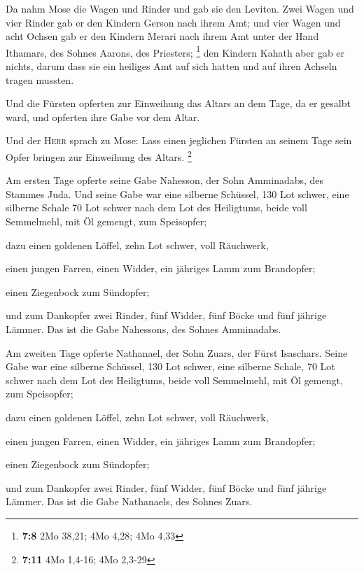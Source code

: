  Da nahm Mose die Wagen und Rinder und gab sie den
Leviten.  Zwei Wagen und vier Rinder gab er den Kindern
Gerson nach ihrem Amt;  und vier Wagen und acht Ochsen gab
er den Kindern Merari nach ihrem Amt unter der Hand Ithamars, des Sohnes
Aarons, des Priesters; \footnote{\textbf{7:8} 2Mo 38,21; 4Mo 4,28; 4Mo
  4,33}  den Kindern Kahath aber gab er nichts, darum dass
sie ein heiliges Amt auf sich hatten und auf ihren Achseln tragen
mussten.

 Und die Fürsten opferten zur Einweihung das Altars an
dem Tage, da er gesalbt ward, und opferten ihre Gabe vor dem Altar.

 Und der \textsc{Herr} sprach zu Mose: Lass einen
jeglichen Fürsten an seinem Tage sein Opfer bringen zur Einweihung des
Altars. \footnote{\textbf{7:11} 4Mo 1,4-16; 4Mo 2,3-29}

 Am ersten Tage opferte seine Gabe Nahesson, der Sohn
Amminadabs, des Stammes Juda.  Und seine Gabe war eine
silberne Schüssel, 130 Lot schwer, eine silberne Schale 70 Lot schwer
nach dem Lot des Heiligtums, beide voll Semmelmehl, mit Öl gemengt, zum
Speisopfer;

 dazu einen goldenen Löffel, zehn Lot schwer, voll
Räuchwerk,

 einen jungen Farren, einen Widder, ein jähriges Lamm zum
Brandopfer;

 einen Ziegenbock zum Sündopfer;

 und zum Dankopfer zwei Rinder, fünf Widder, fünf Böcke
und fünf jährige Lämmer. Das ist die Gabe Nahessons, des Sohnes
Amminadabs.

 Am zweiten Tage opferte Nathanael, der Sohn Zuars, der
Fürst Isaschars.  Seine Gabe war eine silberne Schüssel,
130 Lot schwer, eine silberne Schale, 70 Lot schwer nach dem Lot des
Heiligtums, beide voll Semmelmehl, mit Öl gemengt, zum Speisopfer;

 dazu einen goldenen Löffel, zehn Lot schwer, voll
Räuchwerk,

 einen jungen Farren, einen Widder, ein jähriges Lamm zum
Brandopfer;

 einen Ziegenbock zum Sündopfer;

 und zum Dankopfer zwei Rinder, fünf Widder, fünf Böcke
und fünf jährige Lämmer. Das ist die Gabe Nathanaels, des Sohnes Zuars.

